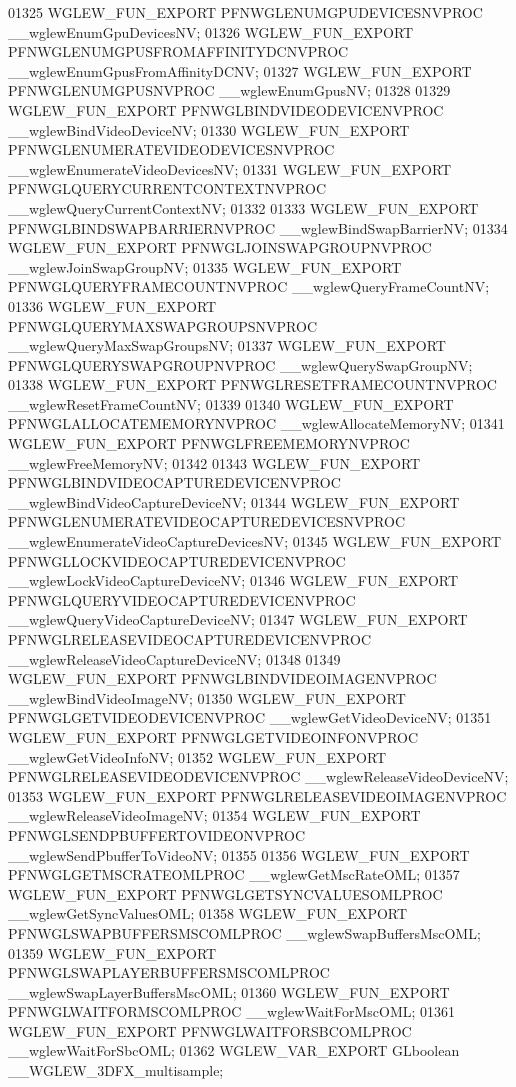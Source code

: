 \begin{DoxyCode}
01325 WGLEW_FUN_EXPORT PFNWGLENUMGPUDEVICESNVPROC __wglewEnumGpuDevicesNV;
01326 WGLEW_FUN_EXPORT PFNWGLENUMGPUSFROMAFFINITYDCNVPROC 
      __wglewEnumGpusFromAffinityDCNV;
01327 WGLEW_FUN_EXPORT PFNWGLENUMGPUSNVPROC __wglewEnumGpusNV;
01328 
01329 WGLEW_FUN_EXPORT PFNWGLBINDVIDEODEVICENVPROC __wglewBindVideoDeviceNV;
01330 WGLEW_FUN_EXPORT PFNWGLENUMERATEVIDEODEVICESNVPROC 
      __wglewEnumerateVideoDevicesNV;
01331 WGLEW_FUN_EXPORT PFNWGLQUERYCURRENTCONTEXTNVPROC __wglewQueryCurrentContextNV;
01332 
01333 WGLEW_FUN_EXPORT PFNWGLBINDSWAPBARRIERNVPROC __wglewBindSwapBarrierNV;
01334 WGLEW_FUN_EXPORT PFNWGLJOINSWAPGROUPNVPROC __wglewJoinSwapGroupNV;
01335 WGLEW_FUN_EXPORT PFNWGLQUERYFRAMECOUNTNVPROC __wglewQueryFrameCountNV;
01336 WGLEW_FUN_EXPORT PFNWGLQUERYMAXSWAPGROUPSNVPROC __wglewQueryMaxSwapGroupsNV;
01337 WGLEW_FUN_EXPORT PFNWGLQUERYSWAPGROUPNVPROC __wglewQuerySwapGroupNV;
01338 WGLEW_FUN_EXPORT PFNWGLRESETFRAMECOUNTNVPROC __wglewResetFrameCountNV;
01339 
01340 WGLEW_FUN_EXPORT PFNWGLALLOCATEMEMORYNVPROC __wglewAllocateMemoryNV;
01341 WGLEW_FUN_EXPORT PFNWGLFREEMEMORYNVPROC __wglewFreeMemoryNV;
01342 
01343 WGLEW_FUN_EXPORT PFNWGLBINDVIDEOCAPTUREDEVICENVPROC 
      __wglewBindVideoCaptureDeviceNV;
01344 WGLEW_FUN_EXPORT PFNWGLENUMERATEVIDEOCAPTUREDEVICESNVPROC 
      __wglewEnumerateVideoCaptureDevicesNV;
01345 WGLEW_FUN_EXPORT PFNWGLLOCKVIDEOCAPTUREDEVICENVPROC 
      __wglewLockVideoCaptureDeviceNV;
01346 WGLEW_FUN_EXPORT PFNWGLQUERYVIDEOCAPTUREDEVICENVPROC 
      __wglewQueryVideoCaptureDeviceNV;
01347 WGLEW_FUN_EXPORT PFNWGLRELEASEVIDEOCAPTUREDEVICENVPROC 
      __wglewReleaseVideoCaptureDeviceNV;
01348 
01349 WGLEW_FUN_EXPORT PFNWGLBINDVIDEOIMAGENVPROC __wglewBindVideoImageNV;
01350 WGLEW_FUN_EXPORT PFNWGLGETVIDEODEVICENVPROC __wglewGetVideoDeviceNV;
01351 WGLEW_FUN_EXPORT PFNWGLGETVIDEOINFONVPROC __wglewGetVideoInfoNV;
01352 WGLEW_FUN_EXPORT PFNWGLRELEASEVIDEODEVICENVPROC __wglewReleaseVideoDeviceNV;
01353 WGLEW_FUN_EXPORT PFNWGLRELEASEVIDEOIMAGENVPROC __wglewReleaseVideoImageNV;
01354 WGLEW_FUN_EXPORT PFNWGLSENDPBUFFERTOVIDEONVPROC __wglewSendPbufferToVideoNV;
01355 
01356 WGLEW_FUN_EXPORT PFNWGLGETMSCRATEOMLPROC __wglewGetMscRateOML;
01357 WGLEW_FUN_EXPORT PFNWGLGETSYNCVALUESOMLPROC __wglewGetSyncValuesOML;
01358 WGLEW_FUN_EXPORT PFNWGLSWAPBUFFERSMSCOMLPROC __wglewSwapBuffersMscOML;
01359 WGLEW_FUN_EXPORT PFNWGLSWAPLAYERBUFFERSMSCOMLPROC __wglewSwapLayerBuffersMscOML;
01360 WGLEW_FUN_EXPORT PFNWGLWAITFORMSCOMLPROC __wglewWaitForMscOML;
01361 WGLEW_FUN_EXPORT PFNWGLWAITFORSBCOMLPROC __wglewWaitForSbcOML;
01362 WGLEW_VAR_EXPORT GLboolean __WGLEW_3DFX_multisample;

\end{DoxyCode}

